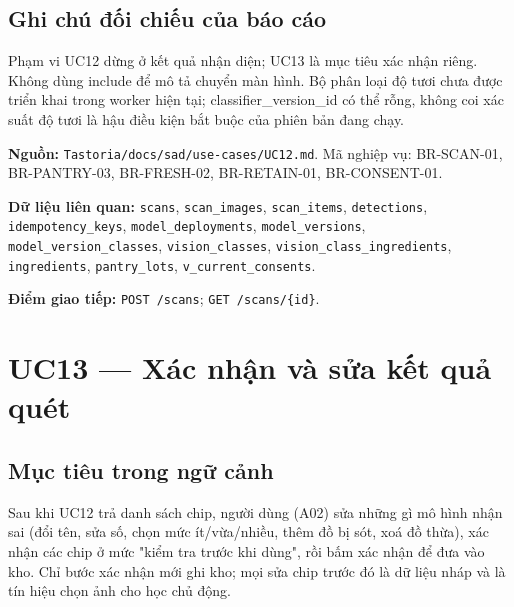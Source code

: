\subsection{Ghi chú đối chiếu của báo cáo}
Phạm vi UC12 dừng ở kết quả nhận diện; UC13 là mục tiêu xác nhận riêng. Không dùng include để mô tả chuyển màn hình. Bộ phân loại độ tươi chưa được triển khai trong worker hiện tại; classifier\_\allowbreak{}version\_\allowbreak{}id có thể rỗng, không coi xác suất độ tươi là hậu điều kiện bắt buộc của phiên bản đang chạy.

\textbf{Nguồn:} {\small\texttt{Tastoria/\allowbreak{}\allowbreak{}docs/\allowbreak{}\allowbreak{}sad/\allowbreak{}\allowbreak{}use-\allowbreak{}cases/\allowbreak{}\allowbreak{}UC12.\allowbreak{}md}}. Mã nghiệp vụ: BR-\allowbreak{}SCAN-\allowbreak{}01, BR-\allowbreak{}PANTRY-\allowbreak{}03, BR-\allowbreak{}FRESH-\allowbreak{}02, BR-\allowbreak{}RETAIN-\allowbreak{}01, BR-\allowbreak{}CONSENT-\allowbreak{}01.

\textbf{Dữ liệu liên quan:} {\small\texttt{scans}}, {\small\texttt{scan\_\allowbreak{}\allowbreak{}images}}, {\small\texttt{scan\_\allowbreak{}\allowbreak{}items}}, {\small\texttt{detections}}, {\small\texttt{idempotency\_\allowbreak{}\allowbreak{}keys}}, {\small\texttt{model\_\allowbreak{}\allowbreak{}deployments}}, {\small\texttt{model\_\allowbreak{}\allowbreak{}versions}}, {\small\texttt{model\_\allowbreak{}\allowbreak{}version\_\allowbreak{}\allowbreak{}classes}}, {\small\texttt{vision\_\allowbreak{}\allowbreak{}classes}}, {\small\texttt{vision\_\allowbreak{}\allowbreak{}class\_\allowbreak{}\allowbreak{}ingredients}}, {\small\texttt{ingredients}}, {\small\texttt{pantry\_\allowbreak{}\allowbreak{}lots}}, {\small\texttt{v\_\allowbreak{}\allowbreak{}current\_\allowbreak{}\allowbreak{}consents}}.

\textbf{Điểm giao tiếp:} {\small\texttt{POST /\allowbreak{}\allowbreak{}scans}}; {\small\texttt{GET /\allowbreak{}\allowbreak{}scans/\allowbreak{}\allowbreak{}\{id\}}}.

\section{UC13 --- Xác nhận và sửa kết quả quét}
\subsection{Mục tiêu trong ngữ cảnh}
Sau khi UC12 trả danh sách chip, người dùng (A02) sửa những gì mô hình nhận sai (đổi tên, sửa số, chọn mức ít/\allowbreak{}vừa/\allowbreak{}nhiều, thêm đồ bị sót, xoá đồ thừa), xác nhận các chip ở mức "kiểm tra trước khi dùng", rồi bấm xác nhận để đưa vào kho. Chỉ bước xác nhận mới ghi kho; mọi sửa chip trước đó là dữ liệu nháp và là tín hiệu chọn ảnh cho học chủ động.

